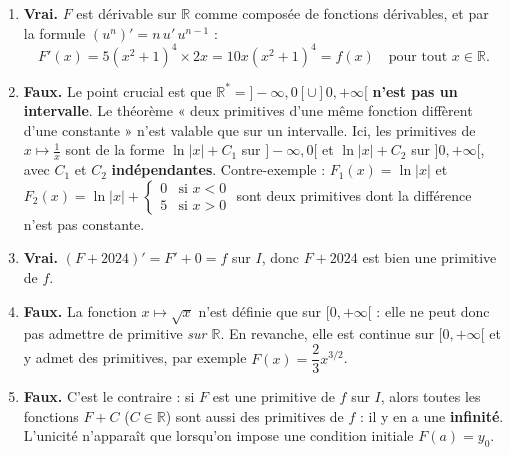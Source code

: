 \documentclass[11pt]{article}
\begin{document}
\begin{corrige}
\begin{enumerate}
\item \textbf{Vrai.} $F$ est dérivable sur $\mathbb{R}$ comme composée de fonctions dérivables, et par la formule $(u^n)' = n\,u'\,u^{n-1}$ :
\[ F'(x) = 5(x^2+1)^4 \times 2x = 10x(x^2+1)^4 = f(x) \quad \text{pour tout } x \in \mathbb{R}. \]
\item \textbf{Faux.} Le point crucial est que $\mathbb{R}^* = ]-\infty,0[ \cup ]0,+\infty[$ \textbf{n'est pas un intervalle}. Le théorème « deux primitives d'une même fonction diffèrent d'une constante » n'est valable que sur un intervalle. Ici, les primitives de $x \mapsto \frac{1}{x}$ sont de la forme $\ln|x| + C_1$ sur $]-\infty,0[$ et $\ln|x| + C_2$ sur $]0,+\infty[$, avec $C_1$ et $C_2$ \textbf{indépendantes}. Contre-exemple : $F_1(x) = \ln|x|$ et $F_2(x) = \ln|x| + \begin{cases} 0 & \text{si } x < 0 \\ 5 & \text{si } x > 0 \end{cases}$ sont deux primitives dont la différence n'est pas constante.
\item \textbf{Vrai.} $(F + 2024)' = F' + 0 = f$ sur $I$, donc $F + 2024$ est bien une primitive de $f$.
\item \textbf{Faux.} La fonction $x \mapsto \sqrt{x}$ n'est définie que sur $[0,+\infty[$ : elle ne peut donc pas admettre de primitive \emph{sur $\mathbb{R}$}. En revanche, elle est continue sur $[0,+\infty[$ et y admet des primitives, par exemple $F(x) = \dfrac{2}{3}x^{3/2}$.
\item \textbf{Faux.} C'est le contraire : si $F$ est une primitive de $f$ sur $I$, alors toutes les fonctions $F + C$ ($C \in \mathbb{R}$) sont aussi des primitives de $f$ : il y en a une \textbf{infinité}. L'unicité n'apparaît que lorsqu'on impose une condition initiale $F(a) = y_0$.
\end{enumerate}
\end{corrige}
\end{document}
